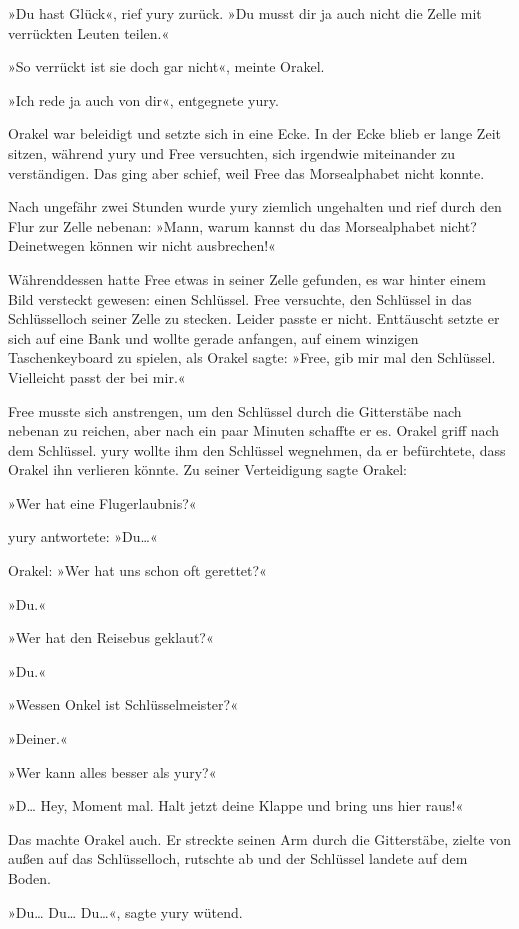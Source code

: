 »Du hast Glück«, rief yury zurück. »Du musst dir ja auch nicht die Zelle mit verrückten Leuten teilen.«

»So verrückt ist sie doch gar nicht«, meinte Orakel.

»Ich rede ja auch von dir«, entgegnete yury.

Orakel war beleidigt und setzte sich in eine Ecke. In der Ecke blieb er lange Zeit sitzen, während yury und Free versuchten, sich irgendwie miteinander zu verständigen. Das ging aber schief, weil Free das Morsealphabet nicht konnte.

Nach ungefähr zwei Stunden wurde yury ziemlich ungehalten und rief durch den Flur zur Zelle nebenan: »Mann, warum kannst du das Morsealphabet nicht? Deinetwegen können wir nicht ausbrechen!«

Währenddessen hatte Free etwas in seiner Zelle gefunden, es war hinter einem Bild versteckt gewesen: einen Schlüssel. Free versuchte, den Schlüssel in das Schlüsselloch seiner Zelle zu stecken. Leider passte er nicht. Enttäuscht setzte er sich auf eine Bank und wollte gerade anfangen, auf einem winzigen Taschenkeyboard zu spielen, als Orakel sagte: »Free, gib mir mal den Schlüssel. Vielleicht passt der bei mir.«

Free musste sich anstrengen, um den Schlüssel durch die Gitterstäbe nach nebenan zu reichen, aber nach ein paar Minuten schaffte er es. Orakel griff nach dem Schlüssel. yury wollte ihm den Schlüssel wegnehmen, da er befürchtete, dass Orakel ihn verlieren könnte. Zu seiner Verteidigung sagte Orakel:

»Wer hat eine Flugerlaubnis?«

yury antwortete: »Du…«

Orakel: »Wer hat uns schon oft gerettet?«

»Du.«

»Wer hat den Reisebus geklaut?«

»Du.«

»Wessen Onkel ist Schlüsselmeister?«

»Deiner.«

»Wer kann alles besser als yury?«

»D… Hey, Moment mal. Halt jetzt deine Klappe und bring uns hier raus!«

Das machte Orakel auch. Er streckte seinen Arm durch die Gitterstäbe, zielte von außen auf das Schlüsselloch, rutschte ab und der Schlüssel landete auf dem Boden.

»Du… Du… Du…«, sagte yury wütend.

